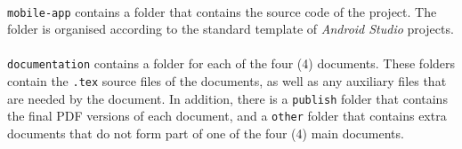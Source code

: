 \documentclass{article}
\begin{document}
    \paragraph{}
    \texttt{mobile-app} contains a folder that contains the source code of the
    project. The folder is organised according to the standard template of
    \textit{Android Studio} projects.

    \paragraph{}
    \texttt{documentation} contains a folder for each of the four (4) documents.
    These folders contain the \texttt{.tex} source files of the documents, as
    well as any auxiliary files that are needed by the document. In addition,
    there is a \texttt{publish} folder that contains the final PDF versions of
    each document, and a \texttt{other} folder that contains extra documents
    that do not form part of one of the four (4) main documents.





\end{document}
